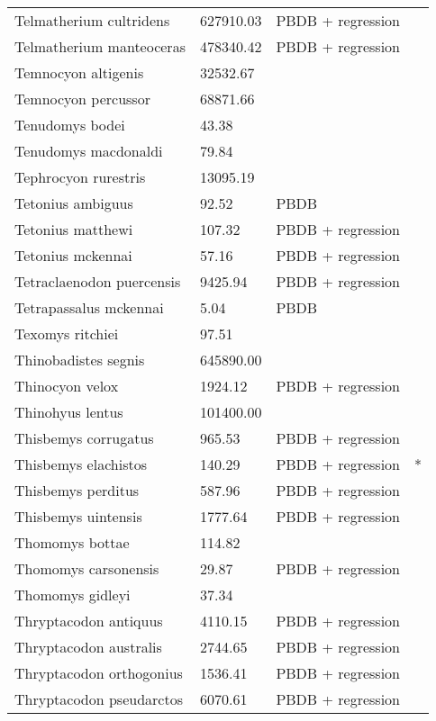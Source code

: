 \documentclass{article}
\begin{document}
\begin{center}
\begin{longtable}{p{} p{} p{} p{}}
    Telmatherium cultridens & 627910.03 & PBDB + regression &  \\ 
    Telmatherium manteoceras & 478340.42 & PBDB + regression &  \\ 
    Temnocyon altigenis & 32532.67 & \cite{Tomiya2013} &  \\ 
    Temnocyon percussor & 68871.66 & \cite{Tomiya2013} &  \\ 
    Tenudomys bodei & 43.38 & \cite{Tomiya2013} &  \\ 
    Tenudomys macdonaldi & 79.84 & \cite{Tomiya2013} &  \\ 
    Tephrocyon rurestris & 13095.19 & \cite{Tomiya2013} &  \\ 
    Tetonius ambiguus & 92.52 & PBDB &  \\ 
    Tetonius matthewi & 107.32 & PBDB + regression &  \\ 
    Tetonius mckennai & 57.16 & PBDB + regression &  \\ 
    Tetraclaenodon puercensis & 9425.94 & PBDB + regression &  \\ 
    Tetrapassalus mckennai & 5.04 & PBDB &  \\ 
    Texomys ritchiei & 97.51 & \cite{Tomiya2013} &  \\ 
    Thinobadistes segnis & 645890.00 & \cite{McDonald2005} &  \\ 
    Thinocyon velox & 1924.12 & PBDB + regression &  \\ 
    Thinohyus lentus & 101400.00 & \cite{McKenna2011} &  \\ 
    Thisbemys corrugatus & 965.53 & PBDB + regression &  \\ 
    Thisbemys elachistos & 140.29 & PBDB + regression & * \\ 
    Thisbemys perditus & 587.96 & PBDB + regression &  \\ 
    Thisbemys uintensis & 1777.64 & PBDB + regression &  \\ 
    Thomomys bottae & 114.82 & \cite{Smith2004} &  \\ 
    Thomomys carsonensis & 29.87 & PBDB + regression &  \\ 
    Thomomys gidleyi & 37.34 & \cite{Tomiya2013} &  \\ 
    Thryptacodon antiquus & 4110.15 & PBDB + regression &  \\ 
    Thryptacodon australis & 2744.65 & PBDB + regression &  \\ 
    Thryptacodon orthogonius & 1536.41 & PBDB + regression &  \\ 
    Thryptacodon pseudarctos & 6070.61 & PBDB + regression &  \\ 

\end{longtable}
\end{center}
\end{document}

